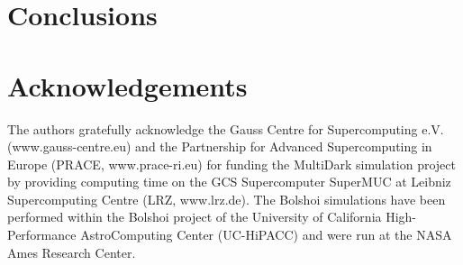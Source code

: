 \documentclass[usenatbib,usegraphicx,letterpaper]{mn2e}
\begin{document}


\section{Conclusions}
\label{section:conclusions}

\section{Acknowledgements}
\label{section:acknowledgements}

The authors gratefully acknowledge the Gauss Centre for Supercomputing e.V. (www.gauss-centre.eu) and the Partnership for Advanced Supercomputing in Europe (PRACE, www.prace-ri.eu) for funding the MultiDark simulation project by providing computing time on the GCS Supercomputer SuperMUC at Leibniz Supercomputing Centre (LRZ, www.lrz.de). The Bolshoi simulations have been performed within the Bolshoi project of the University of California High-Performance AstroComputing Center (UC-HiPACC) and were run at the NASA Ames Research Center.




\end{document}
